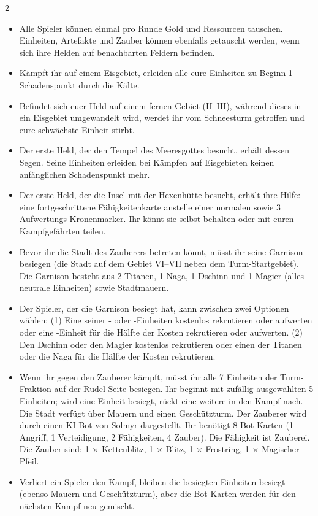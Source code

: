 \begin{multicols*}{2}
\begin{itemize}
    \item Alle Spieler können einmal pro Runde Gold und Ressourcen tauschen. Einheiten, Artefakte und Zauber können ebenfalls getauscht werden, wenn sich ihre Helden auf benachbarten Feldern befinden.
    \item Kämpft ihr auf einem Eisgebiet, erleiden alle eure Einheiten zu Beginn 1 Schadenspunkt durch die Kälte.
    \item Befindet sich euer Held auf einem fernen Gebiet (II--III), während dieses in ein Eisgebiet umgewandelt wird, werdet ihr vom Schneesturm getroffen und eure schwächste Einheit stirbt.
    \item Der erste Held, der den Tempel des Meeresgottes besucht, erhält dessen Segen. Seine Einheiten erleiden bei Kämpfen auf Eisgebieten keinen anfänglichen Schadenspunkt mehr.
    \item Der erste Held, der die Insel mit der Hexenhütte besucht, erhält ihre Hilfe: eine fortgeschrittene Fähigkeitenkarte anstelle einer normalen sowie 3 Aufwertungs-Kronenmarker. Ihr könnt sie selbst behalten oder mit euren Kampfgefährten teilen.
    \item Bevor ihr die Stadt des Zauberers betreten könnt, müsst ihr seine Garnison besiegen (die Stadt auf dem Gebiet VI--VII neben dem Turm-Startgebiet). Die Garnison besteht aus 2  Titanen, 1  Naga, 1  Dschinn und 1  Magier (alles neutrale Einheiten) sowie Stadtmauern.
    \item Der Spieler, der die Garnison besiegt hat, kann zwischen zwei Optionen wählen: (1) Eine seiner - oder -Einheiten kostenlos rekrutieren oder aufwerten oder eine -Einheit für die Hälfte der Kosten rekrutieren oder aufwerten. (2) Den  Dschinn oder den  Magier kostenlos rekrutieren oder einen der  Titanen oder die  Naga für die Hälfte der Kosten rekrutieren.
    \item Wenn ihr gegen den Zauberer kämpft, müsst ihr alle 7 Einheiten der Turm-Fraktion auf der Rudel-Seite besiegen. Ihr beginnt mit zufällig ausgewählten 5 Einheiten; wird eine Einheit besiegt, rückt eine weitere in den Kampf nach. Die Stadt verfügt über Mauern und einen Geschützturm. Der Zauberer wird durch einen KI-Bot von Solmyr dargestellt. Ihr benötigt 8 Bot-Karten (1 Angriff, 1 Verteidigung, 2 Fähigkeiten, 4 Zauber). Die Fähigkeit ist Zauberei. Die Zauber sind: 1 × Kettenblitz, 1 × Blitz, 1 × Frostring, 1 × Magischer Pfeil.
    \item Verliert ein Spieler den Kampf, bleiben die besiegten Einheiten besiegt (ebenso Mauern und Geschützturm), aber die Bot-Karten werden für den nächsten Kampf neu gemischt.
\end{itemize}

\end{multicols*}

